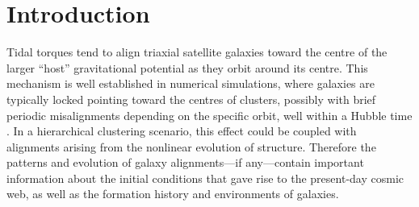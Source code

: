 
\pagebreak

\section{Introduction}

Tidal torques tend to align triaxial satellite galaxies toward the centre of the larger ``host'' 
gravitational potential as they orbit around its centre. This mechanism is well established in 
numerical simulations, where galaxies are typically locked pointing toward the centres of 
clusters, possibly with brief periodic misalignments depending on the specific orbit, well within 
a Hubble time \citep[e.g.,][]{ciotti94,altay06,faltenbacher08,pereira08,pereira10}. In a 
hierarchical clustering scenario, this effect could be coupled with alignments arising from the 
nonlinear evolution of structure. Therefore the patterns and evolution of galaxy alignments---if 
any---contain important information about the initial conditions that gave rise to the present-day 
cosmic web, as well as the formation history and environments of galaxies.

